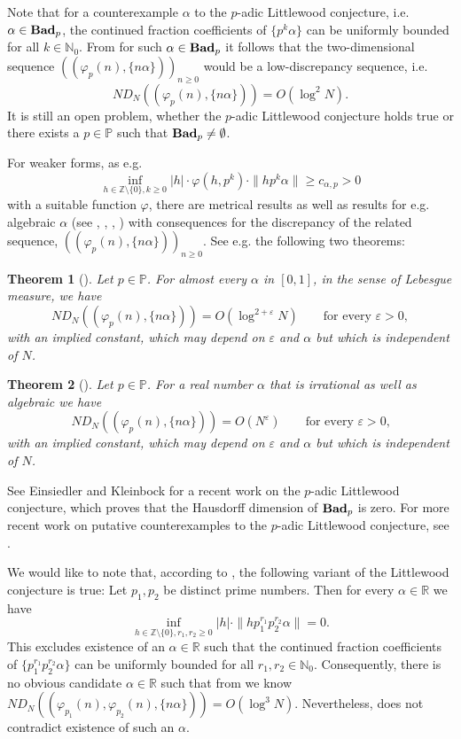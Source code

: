\documentclass{article}
\newcommand{\NN}{\mathbb N}
\newcommand{\ZZ}{\mathbb Z}
\newcommand{\RR}{\mathbb R}
\newcommand{\PP}{\mathbb P}
\renewcommand{\(}{\left (}
\renewcommand{\)}{\right )}
\newtheorem{theorem}{Theorem}[section]
\theoremstyle{definition}
\numberwithin{equation}{section}
\begin{document}
Note that for a counterexample $\alpha$ to the $p$-adic Littlewood conjecture, i.e.  
 $\alpha\in{\bf{Bad}}_p$, the continued fraction coefficients of $\{p^k\alpha\}$ can be uniformly bounded for all $k\in\NN_0$. From \cite[Proposition~2]{HofLar2012} for such $\alpha\in {\bf{Bad}}_p$ it follows that the two-dimensional sequence $((\varphi_p(n),\{n\alpha\}))_{n\geq 0}$ would be a low-discrepancy sequence, i.e.
$$ND_N((\varphi_p(n),\{n\alpha\}))=O(\log^2 N). $$
It is still an open problem, whether the $p$-adic Littlewood conjecture holds true or there exists a $p\in\PP$ such that ${\bf{Bad}}_p\neq \emptyset$. 


For weaker forms, as e.g.
$$\inf_{h\in\ZZ\setminus\{0\},k\geq 0} |h|\cdot\varphi(h,p^k) \cdot\|hp^k\alpha\|\geq c_{\alpha,p}>0$$
with a suitable function $\varphi$,
there are metrical results as well as results for e.g. algebraic $\alpha$ (see \cite{HofLar2012}, \cite{Lar2013}, \cite{Rid1958}, \cite{Bugetal2007}) with consequences for the discrepancy of the related sequence, $((\varphi_p(n),\{n\alpha\}))_{n\geq 0}$. See e.g. the following two theorems: 
\begin{theorem}[\cite{HofLar2012,Lar2013}] Let $p\in\PP$. For almost every $\alpha$ in $[0,1]$, in the sense of Lebesgue measure, we have 
	$$ND_N((\varphi_p(n),\{n\alpha\}))=O( \log^{2+\varepsilon} N) \quad \quad \mbox{for every $\varepsilon>0$},$$
	with an implied constant, which may depend on $\varepsilon$ and $\alpha$ but which is independent of $N$. 
\end{theorem}
\begin{theorem}[\cite{DHL2017}]  Let $p\in\PP$. For a real number $\alpha$ that is irrational as well as algebraic we have
	$$ND_N((\varphi_p(n),\{n\alpha\}))=O( N^{\varepsilon}) \quad \quad \mbox{for every $\varepsilon>0$,}$$
		with an implied constant, which may depend on $\varepsilon$ and $\alpha$ but which is independent of $N$.
\end{theorem}

See Einsiedler and Kleinbock \cite{EK2007} for a recent work on the $p$-adic Littlewood conjecture, which proves that the Hausdorff dimension of ${\bf{Bad}}_p$ is zero. For more recent work on putative counterexamples to the $p$-adic Littlewood conjecture, see \cite{Bla2024}. 

We would like to note that, according to \cite[Theorem~1.3]{EK2007}, the following variant of the Littlewood conjecture is true: Let $p_1,p_2$ be distinct prime numbers. Then for every $\alpha\in\RR$ we have 
$$\inf_{h\in\ZZ\setminus\{0\},r_1,r_2\geq 0}|h|\cdot\|hp_1^{r_1}p_2^{r_2}\alpha\|=0.$$
This excludes existence of an $\alpha\in\RR$ such that the continued fraction coefficients of $\{p_1^{r_1}p_2^{r_2}\alpha\}$ can be uniformly bounded for all $r_1,r_2\in\NN_0$. 
Consequently, there is no obvious candidate $\alpha\in\RR$ such that from \cite[Proposition~2]{HofLar2012} we know $ND_N((\varphi_{p_1}(n),\varphi_{p_2}(n),\{n\alpha\}))=O(\log^3 N)$. Nevertheless, \cite[Theorem~1.3]{EK2007} does not contradict existence of such an $\alpha$. 
\end{document}
